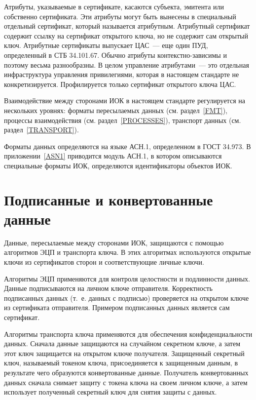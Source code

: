 Атрибуты, указываемые в сертификате, касаются субъекта, эмитента или 
собственно сертификата. Эти атрибуты могут быть вынесены в специальный 
отдельный сертификат, который называется атрибутным. Атрибутный  
сертификат содержит ссылку на сертификат открытого ключа, 
но не содержит сам открытый ключ. 
Атрибутные сертификаты выпускает ЦАС~--- еще один ПУД, 
определенный в СТБ 34.101.67. Обычно атрибуты контекстно-зависимы и поэтому 
весьма разнообразны. В целом управление атрибутами~---  
это отдельная  инфраструктура управления привилегиями, которая в настоящем 
стандарте не конкретизируется. Профилируется только сертификат открытого 
ключа ЦАС.

Взаимодействие между сторонами ИОК в настоящем стандарте регулируется на 
нескольких уровнях: 
форматы пересылаемых данных (см. раздел~\ref{FMT}), 
процессы взаимодействия (см. раздел~\ref{PROCESSES}), 
транспорт данных (см. раздел~\ref{TRANSPORT}).

Форматы данных определяются на языке АСН.1, определенном в ГОСТ 
34.973. В приложении~\ref{ASN1} приводится модуль АСН.1, в котором 
описываются специальные форматы ИОК, определяются идентификаторы объектов 
ИОК.

\section{Подписанные и конвертованные данные}

Данные, пересылаемые между сторонами ИОК, защищаются с помощью 
алгоритмов ЭЦП и транспорта ключа. В этих алгоритмах используются
открытые ключи из сертификатов сторон и соответствующие личные ключи.

Алгоритмы ЭЦП применяются для контроля целостности и подлинности данных.
Данные подписываются на личном ключе отправителя. Корректность подписанных 
данных (т.~е. данных с подписью) проверяется на открытом ключе из 
сертификата отправителя. Примером подписанных данных является сам сертификат. 

Алгоритмы транспорта ключа применяются для обеспечения конфиденциальности 
данных. Сначала данные защищаются на случайном секретном ключе, а затем 
этот ключ защищается на открытом ключе получателя. 
Защищенный секретный ключ, называемый токеном ключа, присоединяется к 
защищенным данным, в результате чего образуются конвертованные данные. 
Получатель конвертованных данных сначала снимает защиту с токена ключа на своем 
личном ключе, а затем использует полученный секретный ключ для снятия 
защиты с данных.  

